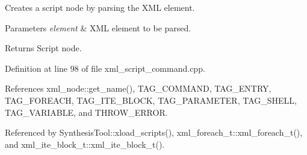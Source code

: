 Creates a script node by parsing the X\+ML element. 


\begin{DoxyParams}{Parameters}
{\em element} & X\+ML element to be parsed. \\
\hline
\end{DoxyParams}
\begin{DoxyReturn}{Returns}
Script node. 
\end{DoxyReturn}


Definition at line 98 of file xml\+\_\+script\+\_\+command.\+cpp.



References xml\+\_\+node\+::get\+\_\+name(), T\+A\+G\+\_\+\+C\+O\+M\+M\+A\+ND, T\+A\+G\+\_\+\+E\+N\+T\+RY, T\+A\+G\+\_\+\+F\+O\+R\+E\+A\+CH, T\+A\+G\+\_\+\+I\+T\+E\+\_\+\+B\+L\+O\+CK, T\+A\+G\+\_\+\+P\+A\+R\+A\+M\+E\+T\+ER, T\+A\+G\+\_\+\+S\+H\+E\+LL, T\+A\+G\+\_\+\+V\+A\+R\+I\+A\+B\+LE, and T\+H\+R\+O\+W\+\_\+\+E\+R\+R\+OR.



Referenced by Synthesis\+Tool\+::xload\+\_\+scripts(), xml\+\_\+foreach\+\_\+t\+::xml\+\_\+foreach\+\_\+t(), and xml\+\_\+ite\+\_\+block\+\_\+t\+::xml\+\_\+ite\+\_\+block\+\_\+t().

